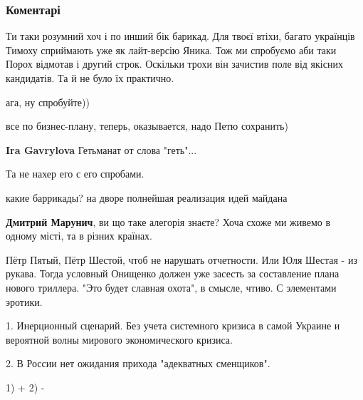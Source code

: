  
 
 
 
 
\subsubsection{Коментарі}

\begin{itemize} %
Ти таки розумний хоч і по инший бік барикад.
Для твоєї втіхи, багато українців Тимоху сприймають уже як лайт-версію Яника. Тож ми спробуємо аби таки Порох відмотав і другий строк. Оскільки трохи він зачистив поле від якісних кандидатів. Та й не було їх практично.

\begin{itemize} %
ага, ну спробуйте))

все по бизнес-плану, теперь, оказывается, надо Петю сохранить)

\textbf{Ira Gavrylova} Гетьманат от слова "геть"...

Та не нахер его с его спробами.

какие баррикады? на дворе полнейшая реализация идей майдана

\textbf{Дмитрий Марунич}, ви що таке алегорія знаєте?
Хоча схоже ми живемо в одному місті, та в різних країнах.

\end{itemize} %


Пётр Пятый, Пётр Шестой, чтоб не нарушать отчетности. Или Юля Шестая - из
рукава. Тогда условный Онищенко должен уже засесть за составление плана нового
триллера. "Это будет славная охота", в смысле, чтиво. С элементами эротики.


1. Инерционный сценарий. Без учета системного кризиса в самой Украине и
вероятной волны мирового экономического кризиса. 

2. В России нет ожидания
прихода "адекватных сменщиков".

\begin{itemize} %
1) + 2) -


\end{itemize}
\end{itemize}
